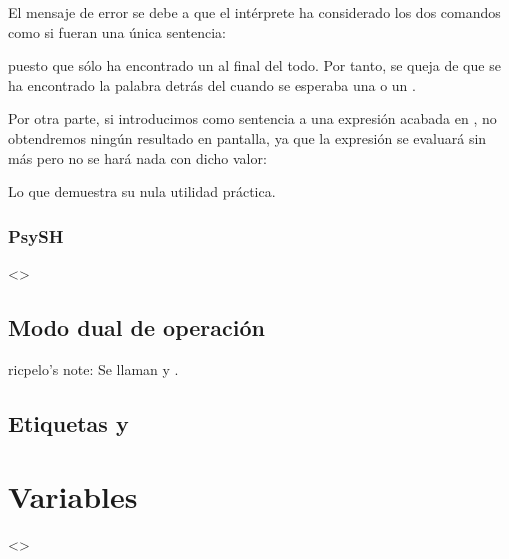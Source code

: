 \documentclass[a4paper,12pt,spanish]{sphinxmanual}
\begin{document}
El mensaje de error se debe a que el intérprete ha considerado los dos comandos
 como si fueran una única sentencia:

\begin{sphinxVerbatim}[commandchars=\\\{\}]
   
\end{sphinxVerbatim}

puesto que sólo ha encontrado un \sphinxcode{;} al final del todo. Por tanto, se queja de
que se ha encontrado la palabra  detrás del  cuando se esperaba
una \sphinxcode{,} o un \sphinxcode{;}.

Por otra parte, si introducimos como sentencia a una expresión acabada en \sphinxcode{;},
no obtendremos ningún resultado en pantalla, ya que la expresión se evaluará sin
más pero no se hará nada con dicho valor:

\begin{sphinxVerbatim}[commandchars=\\\{\}]
\end{sphinxVerbatim}

Lo que demuestra su nula utilidad práctica.


\subsubsection{PsySH}
\label{\detokenize{php:psysh}}
\textless{}\textgreater{}


\subsection{Modo dual de operación}
\label{\detokenize{php:modo-dual-de-operacion}}
ricpelo’s note: Se llaman  y .


\subsection{Etiquetas  y }
\label{\detokenize{php:etiquetas-php-y}}

\section{Variables}
\label{\detokenize{php:variables}}
\textless{}\textgreater{}
\end{document}
